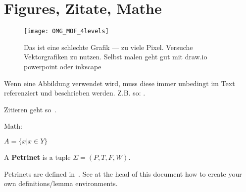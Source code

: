 \section{Figures, Zitate, Mathe}
\begin{figure}[h]
\centering
\texttt{[image: OMG\_MOF\_4levels]}
\caption{Das ist eine schlechte Grafik --- zu viele Pixel. Versuche Vektorgrafiken zu nutzen. Selbst malen geht gut mit draw.io powerpoint
  oder inkscape}\label{fig:mof}
\end{figure}

Wenn eine Abbildung verwendet wird, muss diese immer unbedingt im Text referenziert und beschrieben werden.
Z.B. so: .

Zitieren geht so~\cite{haddadin2013towards}.

Math:

$A = \{x | x \in Y\}$

\begin{defs}\label{def:abc}
    A \textbf{Petrinet} is a tuple ${\Sigma = (P, T, F, W)}$.
\end{defs}

Petrinets are defined in~. See at the head of this document how to create your own definitions/lemma environments.

